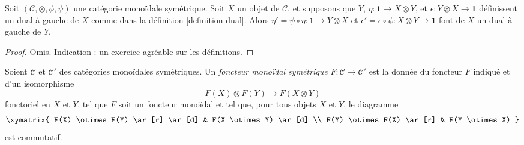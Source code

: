 \begin{lemma}
\label{lemma-dual-symmetric}
Soit $(\mathcal{C}, \otimes, \phi, \psi)$ une catégorie monoïdale symétrique.
Soit $X$ un objet de $\mathcal{C}$, et supposons que $Y$,
$\eta : \mathbf{1} \to X \otimes Y$, et
$\epsilon : Y \otimes X \to \mathbf{1}$
définissent un dual à gauche de $X$ comme dans la définition \ref{definition-dual}.
Alors $\eta' = \psi \circ \eta : \mathbf{1} \to Y \otimes X$
et $\epsilon' = \epsilon \circ \psi : X \otimes Y \to \mathbf{1}$
font de $X$ un dual à gauche de $Y$.
\end{lemma}

\begin{proof}
Omis. Indication : un exercice agréable sur les définitions.
\end{proof}

\begin{definition}
\label{definition-functor-symmetric-monoidal-categories}
Soient $\mathcal{C}$ et $\mathcal{C}'$ des catégories monoïdales symétriques.
Un {\it foncteur monoïdal symétrique}
$F : \mathcal{C} \to \mathcal{C}'$
est la donnée du foncteur $F$ indiqué et d'un isomorphisme
$$
F(X) \otimes F(Y) \to F(X \otimes Y)
$$
fonctoriel en $X$ et $Y$, tel que $F$ soit un foncteur monoïdal et tel que,
pour tous objets $X$ et $Y$, le diagramme
$$
\xymatrix{
F(X) \otimes F(Y) \ar[r] \ar[d] &
F(X \otimes Y) \ar[d] \\
F(Y) \otimes F(X) \ar[r] &
F(Y \otimes X)
}
$$
est commutatif.
\end{definition}

